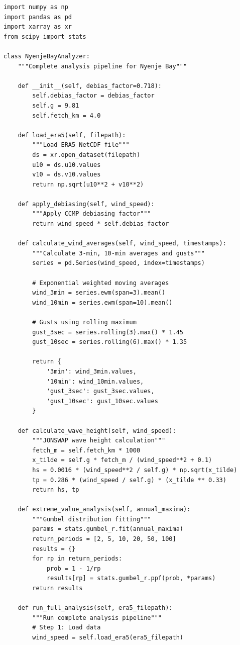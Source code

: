 \documentclass[12pt]{article}
\begin{document}
\begin{lstlisting}[caption=Complete Analysis Pipeline]
import numpy as np
import pandas as pd
import xarray as xr
from scipy import stats

class NyenjeBayAnalyzer:
    """Complete analysis pipeline for Nyenje Bay"""
    
    def __init__(self, debias_factor=0.718):
        self.debias_factor = debias_factor
        self.g = 9.81
        self.fetch_km = 4.0
        
    def load_era5(self, filepath):
        """Load ERA5 NetCDF file"""
        ds = xr.open_dataset(filepath)
        u10 = ds.u10.values
        v10 = ds.v10.values
        return np.sqrt(u10**2 + v10**2)
    
    def apply_debiasing(self, wind_speed):
        """Apply CCMP debiasing factor"""
        return wind_speed * self.debias_factor
    
    def calculate_wind_averages(self, wind_speed, timestamps):
        """Calculate 3-min, 10-min averages and gusts"""
        series = pd.Series(wind_speed, index=timestamps)
        
        # Exponential weighted moving averages
        wind_3min = series.ewm(span=3).mean()
        wind_10min = series.ewm(span=10).mean()
        
        # Gusts using rolling maximum
        gust_3sec = series.rolling(3).max() * 1.45
        gust_10sec = series.rolling(6).max() * 1.35
        
        return {
            '3min': wind_3min.values,
            '10min': wind_10min.values,
            'gust_3sec': gust_3sec.values,
            'gust_10sec': gust_10sec.values
        }
    
    def calculate_wave_height(self, wind_speed):
        """JONSWAP wave height calculation"""
        fetch_m = self.fetch_km * 1000
        x_tilde = self.g * fetch_m / (wind_speed**2 + 0.1)
        hs = 0.0016 * (wind_speed**2 / self.g) * np.sqrt(x_tilde)
        tp = 0.286 * (wind_speed / self.g) * (x_tilde ** 0.33)
        return hs, tp
    
    def extreme_value_analysis(self, annual_maxima):
        """Gumbel distribution fitting"""
        params = stats.gumbel_r.fit(annual_maxima)
        return_periods = [2, 5, 10, 20, 50, 100]
        results = {}
        for rp in return_periods:
            prob = 1 - 1/rp
            results[rp] = stats.gumbel_r.ppf(prob, *params)
        return results
    
    def run_full_analysis(self, era5_filepath):
        """Run complete analysis pipeline"""
        # Step 1: Load data
        wind_speed = self.load_era5(era5_filepath)
        

\end{lstlisting}
\end{document}
